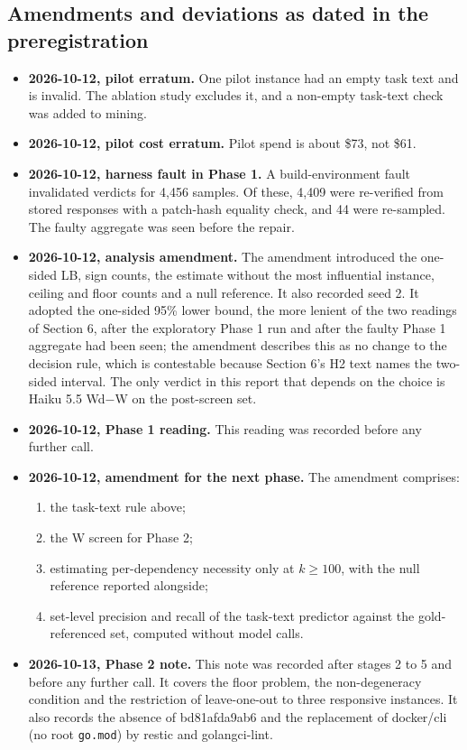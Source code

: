 \subsection{Amendments and deviations as dated in the preregistration}

\begin{itemize}
\item \textbf{2026-10-12, pilot erratum.} One pilot instance had an empty task text and is invalid. The ablation study excludes it, and a non-empty task-text check was added to mining.
\item \textbf{2026-10-12, pilot cost erratum.} Pilot spend is about \$73, not \$61.
\item \textbf{2026-10-12, harness fault in Phase 1.} A build-environment fault invalidated verdicts for 4,456 samples. Of these, 4,409 were re-verified from stored responses with a patch-hash equality check, and 44 were re-sampled. The faulty aggregate was seen before the repair.
\item \textbf{2026-10-12, analysis amendment.} The amendment introduced the one-sided LB, sign counts, the estimate without the most influential instance, ceiling and floor counts and a null reference. It also recorded seed 2. It adopted the one-sided 95\% lower bound, the more lenient of the two readings of Section 6, after the exploratory Phase 1 run and after the faulty Phase 1 aggregate had been seen; the amendment describes this as no change to the decision rule, which is contestable because Section 6's H2 text names the two-sided interval. The only verdict in this report that depends on the choice is Haiku 5.5 Wd$-$W on the post-screen set.
\item \textbf{2026-10-12, Phase 1 reading.} This reading was recorded before any further call.
\item \textbf{2026-10-12, amendment for the next phase.} The amendment comprises:
  \begin{enumerate}
  \item[(i)] the task-text rule above;
  \item[(ii)] the W screen for Phase 2;
  \item[(iii)] estimating per-dependency necessity only at $k \geq 100$, with the null reference reported alongside;
  \item[(iv)] set-level precision and recall of the task-text predictor against the gold-referenced set, computed without model calls.
  \end{enumerate}
\item \textbf{2026-10-13, Phase 2 note.} This note was recorded after stages 2 to 5 and before any further call. It covers the floor problem, the non-degeneracy condition and the restriction of leave-one-out to three responsive instances. It also records the absence of bd81afda9ab6 and the replacement of docker/cli (no root \texttt{go.mod}) by restic and golangci-lint.

\end{itemize}
